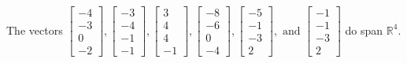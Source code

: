 \begin{exercise}
\begin{exerciseStatement}
  \end{exerciseStatement}
  \begin{exerciseAnswer}
   The vectors \(\left[\begin{array}{r}
-4 \\
-3 \\
0 \\
-2
\end{array}\right] , \left[\begin{array}{r}
-3 \\
-4 \\
-1 \\
-1
\end{array}\right] , \left[\begin{array}{r}
3 \\
4 \\
4 \\
-1
\end{array}\right] , \left[\begin{array}{r}
-8 \\
-6 \\
0 \\
-4
\end{array}\right] , \left[\begin{array}{r}
-5 \\
-1 \\
-3 \\
2
\end{array}\right] , \text{ and } \left[\begin{array}{r}
-1 \\
-1 \\
-3 \\
2
\end{array}\right]\) 
  	 do  
	span \(\mathbb{R}^4\).
  


  \end{exerciseAnswer}
\end{exercise}